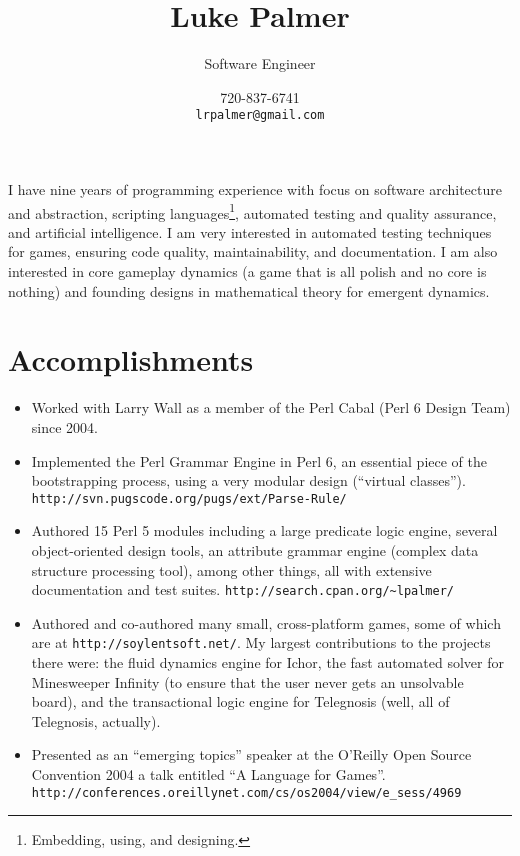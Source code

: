 \documentclass[12pt]{article}
\title{Luke Palmer}
\author{Software Engineer}
\date{720-837-6741 \\ \texttt{lrpalmer@gmail.com}}
\begin{document}
\maketitle

I have nine years of programming experience with focus on software
architecture and abstraction, scripting languages\footnote{Embedding,
using, and designing.}, automated testing and quality assurance, and
artificial intelligence.  I am very interested in automated testing
techniques for games, ensuring code quality, maintainability, and
documentation.  I am also interested in core gameplay dynamics (a game
that is all polish and no core is nothing) and founding designs in
mathematical theory for emergent dynamics.

\section*{Accomplishments}

\begin{itemize}
\item Worked with Larry Wall as a member of the Perl Cabal (Perl 6
Design Team) since 2004.
\item Implemented the Perl Grammar Engine in Perl 6, an essential piece
of the bootstrapping process, using a very modular design (``virtual
classes''). \\
\verb|http://svn.pugscode.org/pugs/ext/Parse-Rule/|
\item Authored 15 Perl 5 modules including a large predicate logic
engine, several object-oriented design tools, an attribute grammar
engine (complex data structure processing tool), among other things, all
with extensive documentation and test suites.
\verb|http://search.cpan.org/~lpalmer/|
\item Authored and co-authored many small, cross-platform games, some of
which are at \verb|http://soylentsoft.net/|.  My largest contributions
to the projects there were: the fluid dynamics engine for Ichor, the
fast automated solver for Minesweeper Infinity (to ensure that the user
never gets an unsolvable board), and the transactional logic engine for
Telegnosis (well, all of Telegnosis, actually).
\item Presented as an ``emerging topics'' speaker at the O'Reilly Open
Source Convention 2004 a talk entitled ``A Language for Games''.  \\
\verb|http://conferences.oreillynet.com/cs/os2004/view/e_sess/4969|
\end{itemize}
\end{document}
